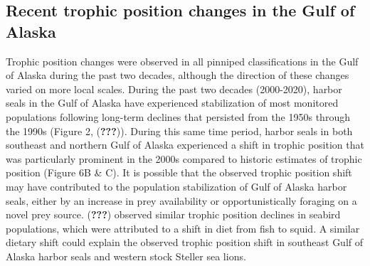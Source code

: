 \documentclass [11pt, proquest] {uwthesis}[2015/03/03]
\begin{document}
\subsection{Recent trophic position changes in the Gulf of
Alaska}\label{recent-trophic-position-changes-in-the-gulf-of-alaska}

Trophic position changes were observed in all pinniped classifications
in the Gulf of Alaska during the past two decades, although the
direction of these changes varied on more local scales. During the past
two decades (2000-2020), harbor seals in the Gulf of Alaska have
experienced stabilization of most monitored populations following
long-term declines that persisted from the 1950s through the 1990s
(Figure 2, ({\textbf{???}})). During this same time period, harbor seals
in both southeast and northern Gulf of Alaska experienced a shift in
trophic position that was particularly prominent in the 2000s compared
to historic estimates of trophic position (Figure 6B \& C). It is
possible that the observed trophic position shift may have contributed
to the population stabilization of Gulf of Alaska harbor seals, either
by an increase in prey availability or opportunistically foraging on a
novel prey source. ({\textbf{???}}) observed similar trophic position
declines in seabird populations, which were attributed to a shift in
diet from fish to squid. A similar dietary shift could explain the
observed trophic position shift in southeast Gulf of Alaska harbor seals
and western stock Steller sea lions.
\end{document}
